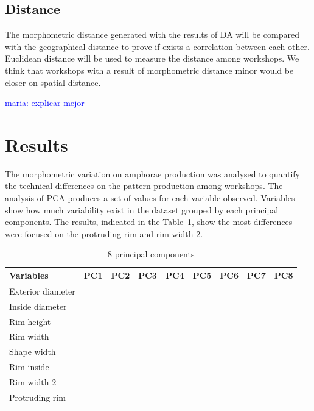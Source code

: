 \documentclass[review]{elsarticle}
\newcommand{\memo}[2]{\textcolor{#1}{#2}}
\newcommand{\xavi}[1]{\memo{orange}{xavi: #1\\}}
\newcommand{\maria}[1]{\memo{blue}{maria: #1\\}}
\begin{document}

\subsection{Distance}

The morphometric distance generated with the results of DA will be compared with the geographical distance to prove if exists a correlation between each other. Euclidean distance will be used to measure the distance among workshops. We think that workshops with a result of morphometric distance minor would be closer on spatial distance. 


\maria{explicar mejor}



\section{Results}

The morphometric variation on amphorae production was analysed to quantify the technical differences on the pattern production among workshops. 
The analysis of PCA produces a set of values for each variable observed. Variables show how much variability exist in the dataset grouped by each principal components. The results, indicated in the Table~\ref{table:variable}, show the most differences were focused on the protruding rim and rim width 2. 

\begin{table}[htp]
\begin{tabular}{lcccccccc}
\hline
 Variables		&        PC1 & PC2	& PC3 & PC4 & PC5 & PC6 & PC7 & PC8     \\ \hline
 Exterior diameter	& 		 &		&	  &  	&	  &	    &     &           \\
 Inside diameter  	& 		 &		&	  &   	&	  &	    &     &           \\
 Rim height          &        &      &     &     &     &     &     &           \\
 Rim width        	&		 &		&	  &  	&	  &		&	  &          \\
 Shape width         &		 &		&	  &  	&	  &		&     &          \\
 Rim inside          &		 &	    &	  &     &	  &		&	  &          \\                                    
 Rim width 2		     & 	     &	    &	  & 		&	  &		&	  &          \\	
 Protruding rim		&        &      &      &     &     &     &     &          \\
\hline
\end{tabular}
\caption{8 principal components}
\label{table:variable}
\end{table}
\end{document}
